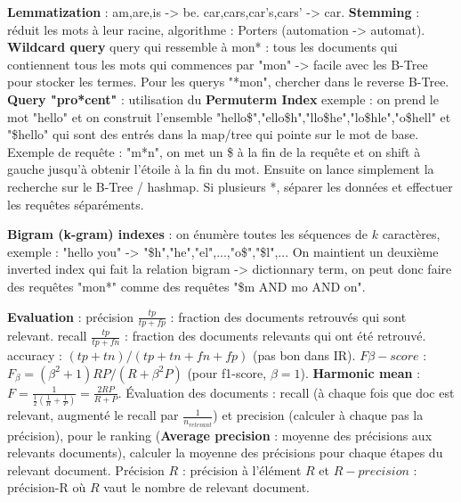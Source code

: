 \documentclass[9pt,a4paper]{report}
\begin{document}
\textbf{Lemmatization} : am,are,is -> be. car,cars,car's,cars' -> car. \textbf{Stemming} : réduit les mots à leur racine, algorithme : Porters (automation -> automat). \textbf{Wildcard query} query qui ressemble à mon* : tous les documents qui contiennent tous les mots qui commences par "mon" -> facile avec les B-Tree pour stocker les termes. Pour les querys "*mon", chercher dans le reverse B-Tree. \textbf{Query "pro*cent"} : utilisation du \textbf{Permuterm Index} exemple : on prend le mot "hello" et on construit l'ensemble "hello\$","ello\$h","llo\$he","lo\$hle","o\$hell" et "\$hello" qui sont des entrés dans la map/tree qui pointe sur le mot de base. Exemple de requête : "m*n", on met un \$ à la fin de la requête et on shift à gauche jusqu'à obtenir l'étoile à la fin du mot. Ensuite on lance simplement la recherche sur le B-Tree / hashmap. Si plusieurs *, séparer les données et effectuer les requêtes séparéments.

\textbf{Bigram (k-gram) indexes} : on énumère toutes les séquences de $k$ caractères, exemple : "hello you" -> "\$h","he","el",...,"o\$","\$l",... On maintient un deuxième inverted index qui fait la relation bigram -> dictionnary term, on peut donc faire des requêtes "mon*" comme des requêtes "\$m AND mo AND on".

\textbf{Evaluation} : précision $\frac{tp}{tp+fp}$ : fraction des documents retrouvés qui sont relevant. recall $\frac{tp}{tp+fn}$ : fraction des documents relevants qui ont été retrouvé. accuracy : $(tp+tn)/(tp+tn+fn+fp)$ (pas bon dans IR). $F\beta-score$ : $F_\beta=(\beta^2+1)RP/(R+\beta^2P)$ (pour f1-score, $\beta=1$). \textbf{Harmonic mean} : $F=\frac{1}{\frac{1}{2}(\frac{1}{R}+\frac{1}{P})}=\frac{2RP}{R+P}$. Évaluation des documents : recall (à chaque fois que doc est relevant, augmenté le recall par $\frac{1}{n_{relevant}}$) et precision (calculer à chaque pas la précision), pour le ranking (\textbf{Average precision} : moyenne des précisions aux relevants documents), calculer la moyenne des précisions pour chaque étapes du relevant document. Précision $R$ : précision à l'élément $R$ et $R-precision$ : précision-R où $R$ vaut le nombre de relevant document.
\end{document}
